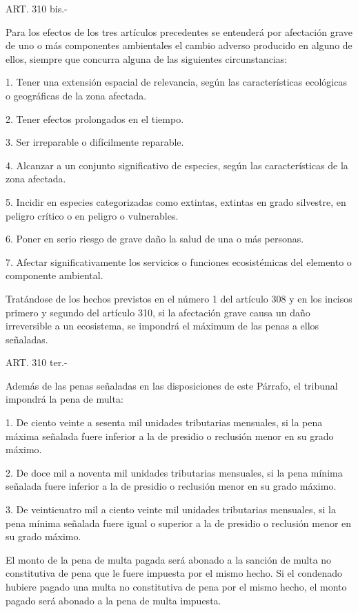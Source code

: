     ART. 310 bis.-

    Para los efectos de los tres artículos precedentes se entenderá por afectación grave de uno o más componentes ambientales el cambio adverso producido en alguno de ellos, siempre que concurra alguna de las siguientes circunstancias:

    1. Tener una extensión espacial de relevancia, según las características ecológicas o geográficas de la zona afectada.

    2. Tener efectos prolongados en el tiempo.

    3. Ser irreparable o difícilmente reparable.

    4. Alcanzar a un conjunto significativo de especies, según las características de la zona afectada.

    5. Incidir en especies categorizadas como extintas, extintas en grado silvestre, en peligro crítico o en peligro o vulnerables.

    6. Poner en serio riesgo de grave daño la salud de una o más personas.

    7. Afectar significativamente los servicios o funciones ecosistémicas del elemento o componente ambiental.

    Tratándose de los hechos previstos en el número 1 del artículo 308 y en los incisos primero y segundo del artículo 310, si la afectación grave causa un daño irreversible a un ecosistema, se impondrá el máximum de las penas a ellos señaladas.


    ART. 310 ter.-

    Además de las penas señaladas en las disposiciones de este Párrafo, el tribunal impondrá la pena de multa:

    1. De ciento veinte a sesenta mil unidades tributarias mensuales, si la pena máxima señalada fuere inferior a la de presidio o reclusión menor en su grado máximo.

    2. De doce mil a noventa mil unidades tributarias mensuales, si la pena mínima señalada fuere inferior a la de presidio o reclusión menor en su grado máximo.

    3. De veinticuatro mil a ciento veinte mil unidades tributarias mensuales, si la pena mínima señalada fuere igual o superior a la de presidio o reclusión menor en su grado máximo.

    El monto de la pena de multa pagada será abonado a la sanción de multa no constitutiva de pena que le fuere impuesta por el mismo hecho. Si el condenado hubiere pagado una multa no constitutiva de pena por el mismo hecho, el monto pagado será abonado a la pena de multa impuesta.


